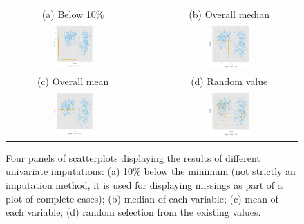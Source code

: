 \documentclass[article]{jss}
\begin{document}
\begin{center}
\begin{figure}[h]
\begin{centering}
\begin{tabular}{cccc}
{\tiny{(a) Below 10\%}} &  &  & {\tiny{(b) Overall median}}\tabularnewline
\includegraphics[width=0.31\textwidth]{graph/fig3-1-below10} &  &  & \includegraphics[width=0.31\textwidth]{graph/fig3-2-median}\tabularnewline
{\tiny{(c) Overall mean}} &  &  & {\tiny{(d) Random value}}\tabularnewline
\includegraphics[width=0.31\textwidth]{graph/fig3-3-mean} &  &  & \includegraphics[width=0.31\textwidth]{graph/fig3-4-random}\tabularnewline
\end{tabular}
\par\end{centering}
\caption{Four panels of scatterplots displaying the results of different univariate imputations: (a) 10\% below the minimum (not strictly an imputation method, it is used for displaying missings as part of a plot of complete cases); (b) median of each variable; (c) mean of each variable; (d) random selection from the existing values.}
\label{fig:univariate-imputation}
\end{figure}
\par\end{center}
\end{document}
